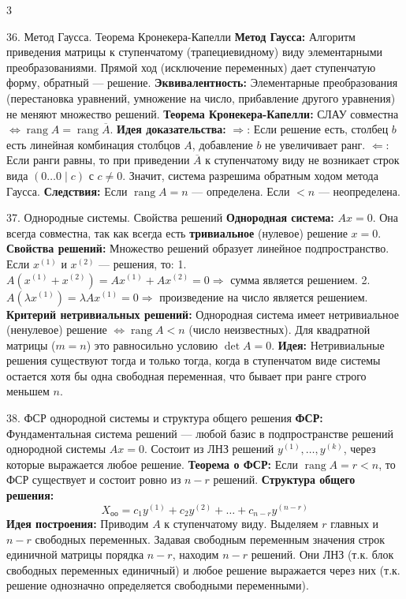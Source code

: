 \documentclass[8pt, a4paper, landscape]{extarticle}
\newcommand{\Ra}{\Rightarrow}
\begin{document}
\begin{multicols*}{3}
\begin{ticket}{36. Метод Гаусса. Теорема Кронекера-Капелли}
\textbf{Метод Гаусса:} Алгоритм приведения матрицы к ступенчатому (трапециевидному) виду элементарными преобразованиями. Прямой ход (исключение переменных) дает ступенчатую форму, обратный --- решение.
\textbf{Эквивалентность:} Элементарные преобразования (перестановка уравнений, умножение на число, прибавление другого уравнения) не меняют множество решений.
\tcblower
\textbf{Теорема Кронекера-Капелли:} СЛАУ совместна $\Leftrightarrow \operatorname{rang} A = \operatorname{rang} \overline{A}$.
\textbf{Идея доказательства:} 
$\Rightarrow$: Если решение есть, столбец $b$ есть линейная комбинация столбцов $A$, добавление $b$ не увеличивает ранг.
$\Leftarrow$: Если ранги равны, то при приведении $\overline{A}$ к ступенчатому виду не возникает строк вида $(0 \dots 0 \mid c)$ с $c \neq 0$. Значит, система разрешима обратным ходом метода Гаусса.
\textbf{Следствия:} Если $\operatorname{rang} A = n$ --- определена. Если $<n$ --- неопределена.
\end{ticket}

\begin{ticket}{37. Однородные системы. Свойства решений}
\textbf{Однородная система:} $Ax = 0$. Она всегда совместна, так как всегда есть \textbf{тривиальное} (нулевое) решение $x = 0$.
\textbf{Свойства решений:} Множество решений образует линейное подпространство. Если $x^{(1)}$ и $x^{(2)}$ --- решения, то:
1. $A(x^{(1)} + x^{(2)}) = Ax^{(1)} + Ax^{(2)} = 0 \Ra$ сумма является решением.
2. $A(\lambda x^{(1)}) = \lambda A x^{(1)} = 0 \Ra$ произведение на число является решением.
\tcblower
\textbf{Критерий нетривиальных решений:}
Однородная система имеет нетривиальное (ненулевое) решение $\Leftrightarrow \operatorname{rang} A < n$ (число неизвестных).
Для квадратной матрицы ($m=n$) это равносильно условию $\det A = 0$.
\textbf{Идея:} Нетривиальные решения существуют тогда и только тогда, когда в ступенчатом виде системы остается хотя бы одна свободная переменная, что бывает при ранге строго меньшем $n$.
\end{ticket}

\begin{ticket}{38. ФСР однородной системы и структура общего решения}
\textbf{ФСР:} Фундаментальная система решений --- любой базис в подпространстве решений однородной системы $Ax = 0$. Состоит из ЛНЗ решений $y^{(1)}, \dots, y^{(k)}$, через которые выражается любое решение.
\textbf{Теорема о ФСР:} Если $\operatorname{rang} A = r < n$, то ФСР существует и состоит ровно из $n - r$ решений.
\tcblower
\textbf{Структура общего решения:}
\[X_{оо} = c_1 y^{(1)} + c_2 y^{(2)} + \dots + c_{n-r} y^{(n-r)}\]
\textbf{Идея построения:} 
Приводим $A$ к ступенчатому виду. Выделяем $r$ главных и $n-r$ свободных переменных. Задавая свободным переменным значения строк единичной матрицы порядка $n-r$, находим $n-r$ решений. Они ЛНЗ (т.к. блок свободных переменных единичный) и любое решение выражается через них (т.к. решение однозначно определяется свободными переменными).
\end{ticket}


\end{multicols*}
\end{document}
